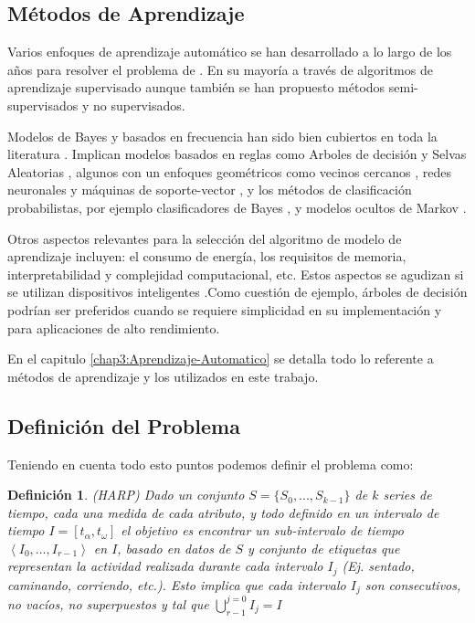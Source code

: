 \subsection{Métodos de Aprendizaje}

Varios enfoques de aprendizaje automático se han desarrollado a lo
largo de los años para resolver el problema de . En su
mayoría a través de algoritmos de aprendizaje supervisado aunque también
se han propuesto métodos semi-supervisados y no supervisados.

Modelos de Bayes y basados en frecuencia han sido bien cubiertos en
toda la literatura . Implican modelos basados en reglas
como Arboles de decisión  y Selvas Aleatorias ,
algunos con un enfoques geométricos como vecinos cercanos ,
redes neuronales  y máquinas de soporte-vector ,
y los métodos de clasificación probabilistas, por ejemplo clasificadores
de Bayes , y modelos ocultos de Markov .

Otros aspectos relevantes para la selección del algoritmo de modelo
de aprendizaje incluyen: el consumo de energía, los requisitos de
memoria, interpretabilidad y complejidad computacional, etc. Estos
aspectos se agudizan si se utilizan dispositivos inteligentes .Como
cuestión de ejemplo, árboles de decisión podrían ser preferidos cuando
se requiere simplicidad en su implementación y  para aplicaciones
de alto rendimiento\cite{ReyesOrtiz2015}.

En el capitulo \ref{chap3:Aprendizaje-Automatico} se detalla todo
lo referente a métodos de aprendizaje y los utilizados en este trabajo.

\subsection{Definición del Problema}

Teniendo en cuenta todo esto puntos podemos definir el problema como:

\newtheorem{defi}{Definición}

\begin{defi}(HARP) Dado un conjunto $S=\{S_{0},...,S_{k-1}\}$ de
$k$ series de tiempo, cada una medida de cada atributo, y todo definido
en un intervalo de tiempo $I=\left[t_{\alpha},t_{\omega}\right]$
el objetivo es encontrar un sub-intervalo de tiempo $\left\langle I_{0},...,I_{r-1}\right\rangle $
en $I$, basado en datos de $S$ y conjunto de etiquetas que representan
la actividad realizada durante cada intervalo $I_{j}$ (Ej. sentado,
caminando, corriendo, etc.). Esto implica que cada intervalo $I_{j}$
son consecutivos, no vacíos, no superpuestos y tal que ${\displaystyle \bigcup_{r-1}^{j=0}{I_{j}=I}}$
\end{defi}


